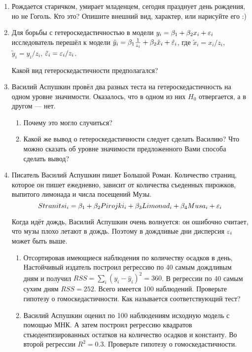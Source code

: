 \documentclass[12pt, a4paper]{article}
\theoremstyle{definition}
\begin{document}
\begin{enumerate}

\item Рождается старичком, умирает младенцем, сегодня празднует день рождения, но не Гоголь.
Кто это? Опишите внешний вид, характер, или нарисуйте его :)

\item Для борьбы с гетероскедастичностью в модели $y_i=\beta_1+\beta_2 x_i+\varepsilon_i$ исследователь перешёл к модели $\tilde{y}_i=\beta_1 \frac{1}{z_i}+\beta_2 \tilde{x}_i+\tilde{\varepsilon}_i$, где $\tilde{x}_i=x_i/z_i$, $\tilde{y}_i=y_i/z_i$, $\tilde{\varepsilon}_i=\varepsilon_i/z_i$.

Какой вид гетероскедастичности предполагался?

\item Василий Аспушкин провёл два разных теста на гетероскедастичность на одном уровне значимости. Оказалось, что в одном из них $H_0$ отвергается, а в другом — нет.
\begin{enumerate}
\item Почему это могло случиться?
\item Какой же вывод о гетероскедастичности следует сделать Василию? Что можно сказать об уровне значимости предложенного Вами способа сделать вывод?

\end{enumerate}


\item Писатель Василий Аспушкин пишет Большой Роман. Количество страниц, которое он пишет ежедневно, зависит от количества съеденных пирожков, выпитого лимонада и числа посещений Музы.
\[
Stranitsi_i = \beta_1 + \beta_2 Pirojki_i + \beta_3 Limonad_i + \beta_4 Musa_i + \varepsilon_i
\]

Когда идёт дождь, Василий Аспушкин очень волнуется: он ошибочно считает, что музы плохо летают в дождь. Поэтому в дождливые дни дисперсия $\varepsilon_i$ может быть выше.


\begin{enumerate}
\item Отсортировав имеющиеся наблюдения по количеству осадков в день, Настойчивый издатель построил регрессию по 40 самым дождливым дням и получил $RSS=\sum_i (y_i-\hat{y}_i)^2=360$. В регрессии по 40 самым сухим дням $RSS=252$. Всего имеется 100 наблюдений. Проверьте гипотезу о гомоскедастичности. Как называется соответствующий тест?

\item Василий Аспушкин оценил по 100 наблюдениям исходную модель с помощью МНК. А затем построил регрессию квадратов стьюдентизированных остатков на количество осадков и константу. Во второй регрессии $R^2=0.3$. Проверьте гипотезу о гомоскедастичности.


\end{enumerate}
\end{enumerate}
\end{document}
